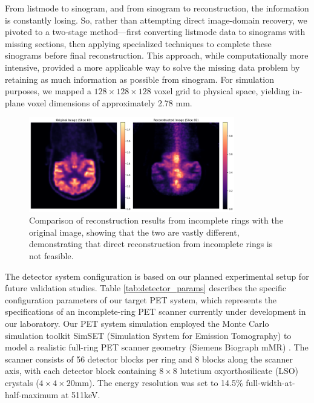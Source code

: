 \documentclass[aps,prb,preprint,groupedaddress,showkeys]{revtex4}
\begin{document}



From listmode to sinogram, and from sinogram to reconstruction, the information is constantly losing. So, rather than attempting direct image-domain recovery, we pivoted to a two-stage method—first converting listmode data to sinograms with missing sections, then applying specialized techniques to complete these sinograms before final reconstruction. This approach, while computationally more intensive, provided a more applicable way to solve the missing data problem by retaining as much information as possible from sinogram.
For simulation purposes, we mapped a $128\times128\times128$ voxel grid to physical space, yielding in-plane voxel dimensions of approximately 2.78 mm.


\begin{figure}[htbp]
    \centering
    \vspace{-0.2cm}
    \includegraphics[width=0.8\textwidth]{Images/output2}
    \vspace{-0.2cm}
    \caption{Comparison of reconstruction results from incomplete rings with the original image, showing that the two are vastly different, demonstrating that direct reconstruction from incomplete rings is not feasible.}
    \vspace{-0.2cm}
    \label{fig:pet_incomplete_reconstruction}
\end{figure}

The detector system configuration is based on our planned experimental setup for future validation studies. Table \ref{tab:detector_params} describes the specific configuration parameters of our target PET system, which represents the specifications of an incomplete-ring PET scanner currently under development in our laboratory. 
Our PET system simulation employed the Monte Carlo simulation toolkit SimSET (Simulation System for Emission Tomography) \cite{Harrison157P} to model a realistic full-ring PET scanner geometry (Siemens Biograph mMR) \cite{Delso1914}. The scanner consists of 56 detector blocks per ring and 8 blocks along the scanner axis, with each detector block containing $8 \times 8$ lutetium oxyorthosilicate (LSO) crystals ($4 \times 4 \times 20$mm). The energy resolution was set to 14.5\% full-width-at-half-maximum at 511keV.
\end{document}

